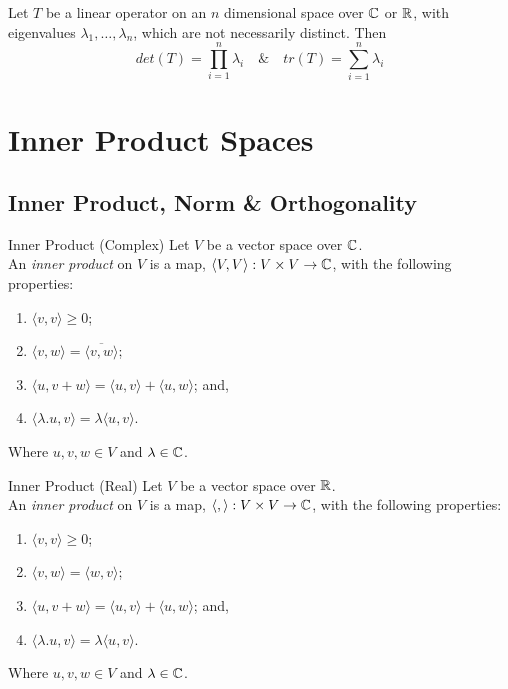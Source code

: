 \documentclass[11pt,a4paper]{article}
\begin{document}
\subtitle{Theorem 8.21 - }{}
Let $T$ be a linear operator on an $n$ dimensional space over $\mathbb{C}$ or $\mathbb{R}$, with eigenvalues $\lambda_1 , \dots , \lambda_n$, which are not necessarily distinct. Then
$$det(T) = \prod_{i=1}^n \lambda_i \quad \& \quad tr(T) = \sum_{i=1}^n \lambda_i$$

\section{Inner Product Spaces}

\subsection{Inner Product, Norm \& Orthogonality}

\subtitle{Definition 9.01 - }{Inner Product (Complex)}
Let $V$ be a vector space over $\mathbb{C}$.\\
An \textit{inner product} on $V$ is a map, $\langle V, V \rangle : V \times V \to \mathbb{C}$, with the following properties:
\begin{enumerate}[label=\roman*)]
  \item $\langle v, v \rangle \geq 0$;
  \item $\langle v, w \rangle = \overline{\langle v, w \rangle}$;
  \item $\langle u, v + w \rangle = \langle u, v \rangle + \langle u, w \rangle$; and,
  \item $\langle \lambda.u , v \rangle = \lambda \langle u, v \rangle$.
\end{enumerate}
Where $u, v, w \in V$ and $\lambda \in \mathbb{C}$.\\

\subtitle{Definition 9.02 - }{Inner Product (Real)}
Let $V$ be a vector space over $\mathbb{R}$.\\
An \textit{inner product} on $V$ is a map, $\langle , \rangle : V \times V \to \mathbb{C}$, with the following properties:
\begin{enumerate}[label=\roman*)]
  \item $\langle v, v \rangle \geq 0$;
  \item $\langle v, w \rangle = \langle w, v \rangle$;
  \item $\langle u, v + w \rangle = \langle u, v \rangle + \langle u, w \rangle$; and,
  \item $\langle \lambda.u , v \rangle = \lambda \langle u, v \rangle$.
\end{enumerate}
Where $u, v, w \in V$ and $\lambda \in \mathbb{C}$.\\
\end{document}
